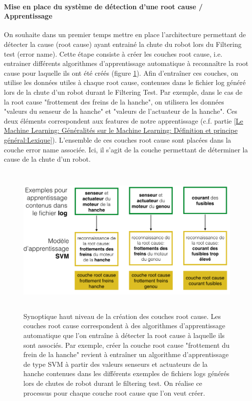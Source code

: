 \paragraph{Mise en place du système de détection d'une root cause / Apprentissage}
On souhaite dans un premier temps mettre en place l'architecture permettant de détecter la cause (root cause) ayant entrainé la chute du robot lors du Filtering test (error name). Cette étape consiste à créer les couches root cause, i.e. entrainer différents algorithmes d'apprentissage automatique à reconnaître la root cause pour laquelle ils ont été créés (figure \ref{fig:Creation des couches root cause}). Afin d'entraîner ces couches, on utilise les données utiles à chaque root cause, contenues dans le fichier log généré lors de la chute d'un robot durant le Filtering Test. Par exemple, dans le cas de la root cause "frottement des freins de la hanche", on utilisera les données "valeurs du senseur de la hanche" et "valeurs de l'actuateur de la hanche". Ces deux éléments correspondent aux features de notre apprentissage (c.f. partie \ref{Le Machine Learning: Généralités sur le Machine Learning: Définition et principe général:Lexique}). L'ensemble de ces couches root cause sont placées dans la couche error name associée. Ici, il s'agit de la couche permettant de déterminer la cause de la chute d'un robot.

\begin{figure}[h]
	\centering\includegraphics[height=7.5cm]{images/synoptique_root.png}
	\caption[Création des couches root cause]{Synoptique haut niveau de la création des couches root cause. Les couches root cause correspondent à des algorithmes d'apprentissage automatique que l'on entraîne à détecter la root cause à laquelle ils sont associés. Par exemple, créer la couche root cause "frottement du frein de la hanche" revient à entraîner un algorithme d'apprentissage de type SVM à partir des valeurs senseurs et actuateurs de la hanche contenues dans les différents exemples de fichiers logs générés lors de chutes de robot durant le filtering test. On réalise ce processus pour chaque couche root cause que l'on veut créer.}
	\label{fig:Creation des couches root cause}
\end{figure}

